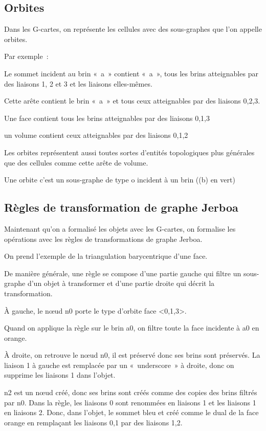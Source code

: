 \documentclass[a4paper]{article}
\begin{document}
\subsection{Orbites}



Dans les G-cartes, on représente les cellules avec des sous-graphes que l'on
appelle orbites.

Par exemple~:

Le sommet incident au brin «~a~» contient «~a~», tous les brins atteignables par des
liaisons 1, 2 et 3 et les liaisons elles-mêmes.

Cette arête contient le brin «~a~» et tous ceux atteignables par des liaisons 0,2,3.

Une face contient tous les brins atteignables par des liaisons 0,1,3

un volume contient ceux atteignables par des liaisons 0,1,2

Les orbites représentent aussi toutes sortes d'entités topologiques plus générales que des
cellules comme cette arête de volume.

Une orbite c'est un sous-graphe de type o incident à un brin ((b) en vert)



\subsection{Règles de transformation de graphe Jerboa}



Maintenant qu'on a formalisé les objets avec les G-cartes, on formalise les
opérations avec les règles de transformations de graphe Jerboa.

On prend l'exemple de la triangulation barycentrique d'une face.

De manière générale, une règle se compose d'une partie gauche qui filtre un
sous-graphe d'un objet à transformer et d'une partie droite qui décrit la transformation.

À gauche, le nœud n0 porte le type d'orbite face <0,1,3>.

Quand on applique la règle sur le brin a0, on filtre toute la face incidente à a0 en orange.

À droite, on retrouve le nœud n0, il est préservé donc ses brins sont préservés. La liaison 1 à gauche est remplacée par un «~underscore~» à droite, donc on supprime les liaisons 1 dans l'objet.

n2 est un nœud créé, donc ses brins sont créés comme des copies des brins filtrés par n0. %
Dans la règle, les liaisons 0 sont renommées en liaisons 1 et les liaisons 1 en liaisons 2. %
Donc, dans l'objet, le sommet bleu et créé comme le dual de la face orange en remplaçant les liaisons 0,1 par des liaisons 1,2. %
\end{document}
